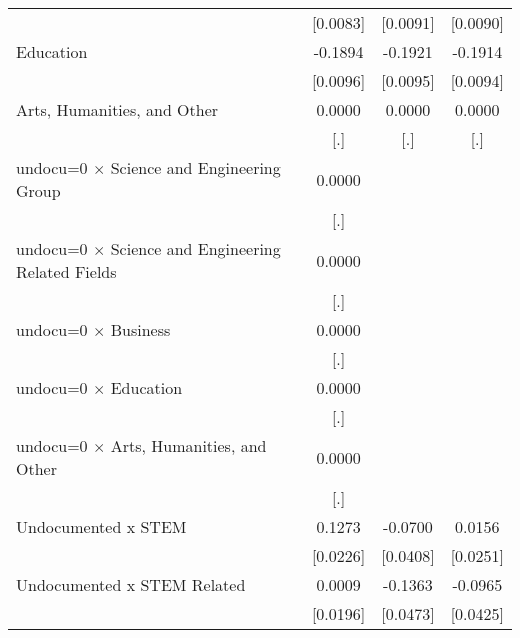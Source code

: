 \begin{table}[htbp]
\begin{tabular}{l*{3}{c}}
                    &    [0.0083]         &    [0.0091]         &    [0.0090]         \\
\addlinespace
Education           &     -0.1894\sym{***}&     -0.1921\sym{***}&     -0.1914\sym{***}\\
                    &    [0.0096]         &    [0.0095]         &    [0.0094]         \\
\addlinespace
Arts, Humanities, and Other&      0.0000         &      0.0000         &      0.0000         \\
                    &         [.]         &         [.]         &         [.]         \\
\addlinespace
undocu=0 $\times$ Science and Engineering Group&      0.0000         &                     &                     \\
                    &         [.]         &                     &                     \\
\addlinespace
undocu=0 $\times$ Science and Engineering Related Fields&      0.0000         &                     &                     \\
                    &         [.]         &                     &                     \\
\addlinespace
undocu=0 $\times$ Business&      0.0000         &                     &                     \\
                    &         [.]         &                     &                     \\
\addlinespace
undocu=0 $\times$ Education&      0.0000         &                     &                     \\
                    &         [.]         &                     &                     \\
\addlinespace
undocu=0 $\times$ Arts, Humanities, and Other&      0.0000         &                     &                     \\
                    &         [.]         &                     &                     \\
\addlinespace
Undocumented x STEM &      0.1273\sym{***}&     -0.0700\sym{*}  &      0.0156         \\
                    &    [0.0226]         &    [0.0408]         &    [0.0251]         \\
\addlinespace
Undocumented x STEM Related&      0.0009         &     -0.1363\sym{***}&     -0.0965\sym{**} \\
                    &    [0.0196]         &    [0.0473]         &    [0.0425]         \\

\end{tabular}
\end{table}

